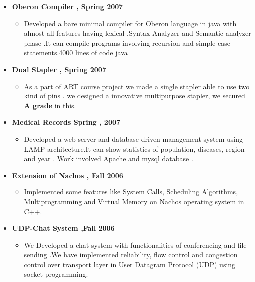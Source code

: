 \documentclass[margin]{res}
\makeatletter
\newcommand{\resitem}[1]{\item #1 \vspace{-2pt}}
\newcommand{\ressubheading}[4]{
\begin{tabular*}{6.5in}{l@{\extracolsep{\fill}}r}
		\textbf{#1} & #2 \\
		\textit{#3} & \textit{#4} \\
\end{tabular*}\vspace{-6pt}}
\makeatother
\begin{document}
\begin{itemize}
\begin{itemize}
		\end{itemize}			
	\vspace{-0.1in}
	\item \textbf{Oberon Compiler , Spring 2007}
		\vspace{-0.1in}
		\begin{itemize}
		\resitem{ Developed a bare minimal compiler for Oberon language in java with almost all  features having  lexical ,Syntax Analyzer and  Semantic analyzer phase .It can compile programs involving recursion and simple case statements.4000 lines of code java}
		\end{itemize}		
		
		\vspace{-0.1in}
			\item \textbf{Dual Stapler , Spring 2007}	
		\vspace{-0.1in}
		\begin{itemize}
		\resitem{As a part of ART course project we made a single stapler able to use two kind of pins . we  designed a innovative multipurpose stapler, we secured \textbf{A grade} in this.}
		\end{itemize}	
		\vspace{-0.1in}
			\item \textbf{Medical Records Spring , 2007}
		\vspace{-0.1in}
		\begin{itemize}
		\resitem{ Developed a web server and database driven management system  using LAMP architecture.It can show statistics of population, diseases, region and  year . Work involved Apache  and mysql database .}
	
		\end{itemize}	
		\vspace{-0.1in}
\item \textbf{Extension of Nachos , Fall 2006}
		\vspace{-0.1in}
		\begin{itemize}
		\resitem{Implemented some features like System Calls, Scheduling Algorithms, Multiprogramming and Virtual Memory on Nachos  operating system in C++.}
		\end{itemize}
	
	
\vspace{-0.1in}	
\item \textbf{UDP-Chat System ,Fall 2006}	
		\vspace{-0.1in}
		\begin{itemize}
		\resitem{We Developed a chat system with functionalities of conferencing and file sending .We have implemented reliability, flow control and congestion control over transport layer in User Datagram Protocol (UDP) using socket programming.}
		\end{itemize}
		

\end{itemize}
\end{document}
